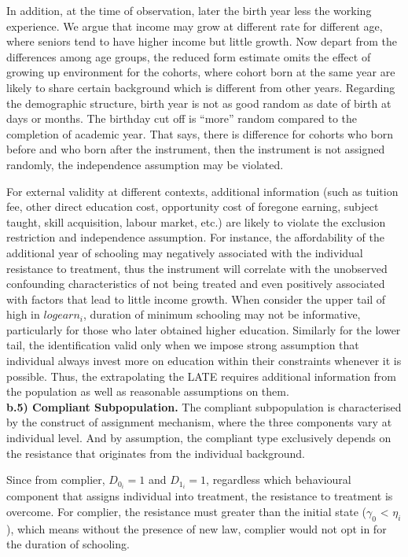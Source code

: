 \documentclass[a4paper,12pt,oneside,English]{article}
\begin{document}
In addition, at the time of observation, later the birth year less the working experience. We argue that income may grow at different rate for different age, where seniors tend to have higher income but little growth. Now depart from the differences among age groups, the reduced form estimate omits the effect of growing up environment for the cohorts, where cohort born at the same year are likely to share certain background which is different from other years. Regarding the demographic structure, birth year is not as good random as date of birth at days or months. The birthday cut off is “more” random compared to the completion of academic year. That says, there is difference for cohorts who born before and who born after the instrument, then the instrument is not assigned randomly, the independence assumption may be violated.

For external validity at different contexts, additional information (such as tuition fee, other direct education cost, opportunity cost of foregone earning, subject taught, skill acquisition, labour market, etc.) are likely to violate the exclusion restriction and independence assumption. For instance, the affordability of the additional year of schooling may negatively associated with the individual resistance to treatment, thus the instrument will correlate with the unobserved confounding characteristics of not being treated and even positively associated with factors that lead to little income growth. When consider the upper tail of high in \emph{$logearn_i$}, duration of minimum schooling may not be informative, particularly for those who later obtained higher education. Similarly for the lower tail, the identification valid only when we impose strong assumption that individual always invest more on education within their constraints whenever it is possible. Thus, the extrapolating the LATE requires additional information from the population as well as reasonable assumptions on them. \\

\textbf{b.5) Compliant Subpopulation.} The compliant subpopulation is characterised by the construct of assignment mechanism, where the three components vary at individual level. And by assumption, the compliant type exclusively depends on the resistance that originates from the individual background.

Since from complier, $D_0_i=1$ and $D_1_i=1$, regardless which behavioural component that assigns individual into treatment, the resistance to treatment is overcome. For complier, the resistance must greater than the initial state ($\gamma_0$ < $\eta_i$), which means without the presence of new law, complier would not opt in for the duration of schooling.
\end{document}
